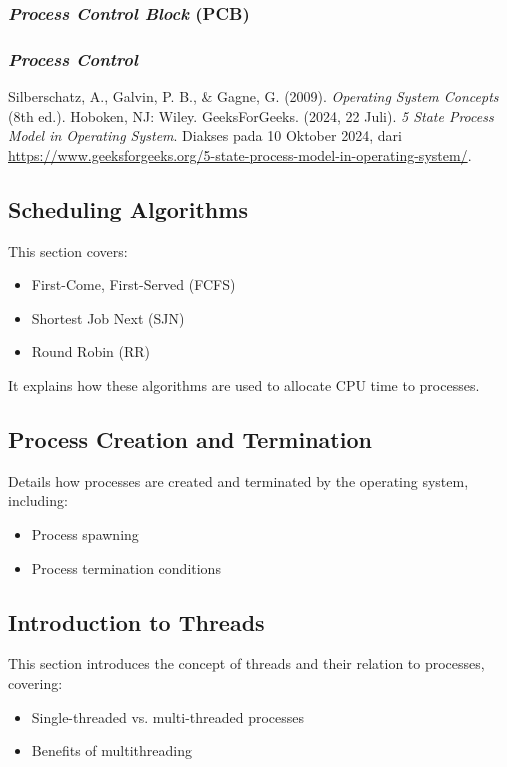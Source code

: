 \documentclass[12pt]{article}
\begin{document}
        \subsubsection {\textit{Process Control Block} (PCB)}
        \subsubsection {\textit{Process Control}}
    \begin{thebibliography}{9}
    Silberschatz, A., Galvin, P. B., \& Gagne, G. (2009). \textit{Operating System Concepts} (8th ed.). Hoboken, NJ: Wiley.
    GeeksForGeeks. (2024, 22 Juli). \textit{5 State Process Model in Operating System}. Diakses pada 10 Oktober 2024, dari \url{https://www.geeksforgeeks.org/5-state-process-model-in-operating-system/}.    
    \end{thebibliography}

\subsection{Scheduling Algorithms}
This section covers:
\begin{itemize}
    \item First-Come, First-Served (FCFS)
    \item Shortest Job Next (SJN)
    \item Round Robin (RR)
\end{itemize}
It explains how these algorithms are used to allocate CPU time to processes.

\subsection{Process Creation and Termination}
Details how processes are created and terminated by the operating system, including:
\begin{itemize}
    \item Process spawning
    \item Process termination conditions
\end{itemize}

\subsection{Introduction to Threads}
This section introduces the concept of threads and their relation to processes, covering:
\begin{itemize}
    \item Single-threaded vs. multi-threaded processes
    \item Benefits of multithreading
\end{itemize}
\end{document}
